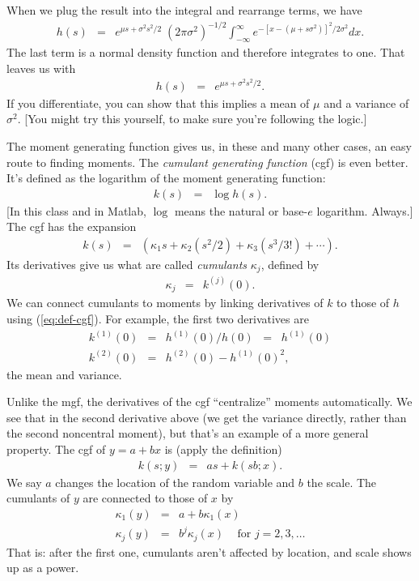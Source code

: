 \documentclass[11pt]{article}
\begin{document}
\begin{itemize}
When we plug the result into the integral and rearrange terms, 
we have 
\begin{eqnarray*}
        h(s) &=& e^{\mu s + \sigma^2 s^2/2} \; (2\pi \sigma^2)^{-1/2}
        \int_{-\infty}^\infty e^{-[x-(\mu+s\sigma^2)]^2/2\sigma^2} dx .
\end{eqnarray*}
The last term is a normal density function 
and therefore integrates to one.
That leaves us with 
\begin{eqnarray*}
        h(s) &=& e^{\mu s + \sigma^2 s^2/2}  .
\end{eqnarray*}
If you differentiate, you can show that this implies
a mean of $\mu$ and a variance of $\sigma^2$.
[You might try this yourself, to make sure you're following the logic.] 
\end{itemize}


The moment generating function gives us, in these and many other cases,
an easy route to finding moments.
The {\it cumulant generating function\/} (cgf) is even better.
It's defined as the logarithm of the moment generating function:
\begin{eqnarray}
    k(s) &=& \log h(s) .
    \label{eq:def-cgf}
\end{eqnarray}
[In this class and in Matlab, $\log$ means the natural or base-$e$ logarithm.
Always.]
The cgf has the expansion
\begin{eqnarray*}
    k(s) &=& \left( \kappa_1 s + \kappa_2 (s^2/2) + \kappa_3 (s^3/3!) + \cdots \right) .
\end{eqnarray*}
Its derivatives give us what are called {\it cumulants\/} $\kappa_j$,
defined by
\begin{eqnarray*}
    \kappa_j &=& k^{(j)}(0) .
\end{eqnarray*}
We can connect cumulants to moments by linking derivatives of $k$
to those of $h$ using (\ref{eq:def-cgf}).
For example, the first two derivatives are
\begin{eqnarray*}
    k^{(1)}(0) &=& h^{(1)}(0) / h(0) \;\;=\;\; h^{(1)}(0) \\
    k^{(2)}(0) &=& h^{(2)}(0) - h^{(1)}(0)^2 ,
\end{eqnarray*}
the mean and variance.

Unlike the mgf, the derivatives of the cgf ``centralize'' moments automatically.
We see that in the second derivative above
(we get the variance directly, rather than the second noncentral moment),
but that's an example of a more general property.
The cgf of $y = a+bx$ is (apply the definition)
\begin{eqnarray*}
    k(s; y) &=& a s + k(sb; x) .
\end{eqnarray*}
We say $a$ changes the location of the random variable and $b$ the scale.
The cumulants of $y$ are connected to those of $x$ by
\begin{eqnarray*}
    \kappa_1 (y) &=& a + b \kappa_1 (x) \\
    \kappa_j (y) &=& b^j \kappa_j (x) \;\;\; \mbox{ for } j=2,3,\ldots
\end{eqnarray*}
That is:  after the first one, cumulants aren't affected by location,
and scale shows up as a power.
\end{document}

